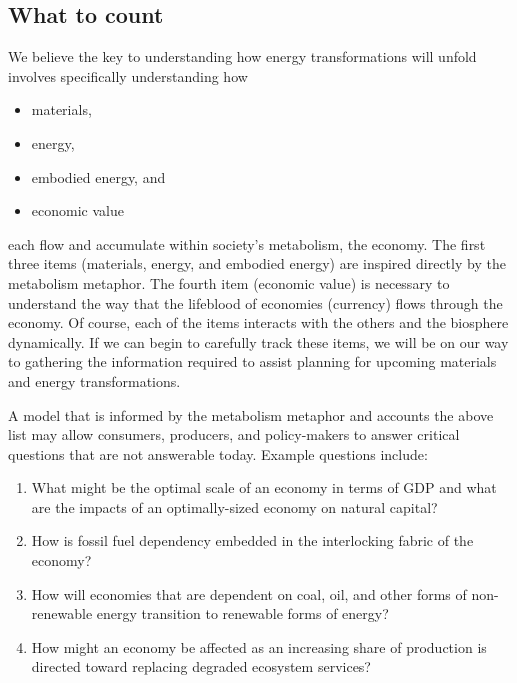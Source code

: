 \subsection{What to count}
\label{sec:what_to_count}

We believe the key to understanding how energy transformations will unfold
involves specifically understanding how

\begin{itemize}
	\item{materials,}
	\item{energy,}
	\item{embodied energy, and}
	\item{economic value}
\end{itemize}

\noindent{}each flow and accumulate within society's metabolism, the economy.
The first three items (materials, energy, and embodied energy) are
inspired directly by the metabolism metaphor.
The fourth item (economic value) is necessary to understand the way 
that the lifeblood of economies (currency) flows through the economy.
Of course, each of the items interacts with the others 
and the biosphere dynamically.
If we can begin to carefully track these items, 
we will be on our way to gathering the information required to 
assist planning for upcoming materials and energy transformations.

A model that is informed by the metabolism metaphor and accounts the above list
may allow consumers, producers,
and policy-makers to answer critical questions that are not
answerable today. Example questions include:

\begin{enumerate}
	\item{What might be the optimal scale of an economy in terms of GDP 
			and what are the impacts of an optimally-sized economy on natural capital?}
    \item{How is fossil fuel dependency embedded in the interlocking fabric of the economy?} 
    \item{How will economies that are dependent on coal, oil, 
 			and other forms of non-renewable energy transition 
			to renewable forms of energy?}
	\item{How might an economy be affected as an increasing share of production
			is directed toward replacing 
			degraded ecosystem services?~\cite[p.~221]{kummel2011}​}
\end{enumerate}

